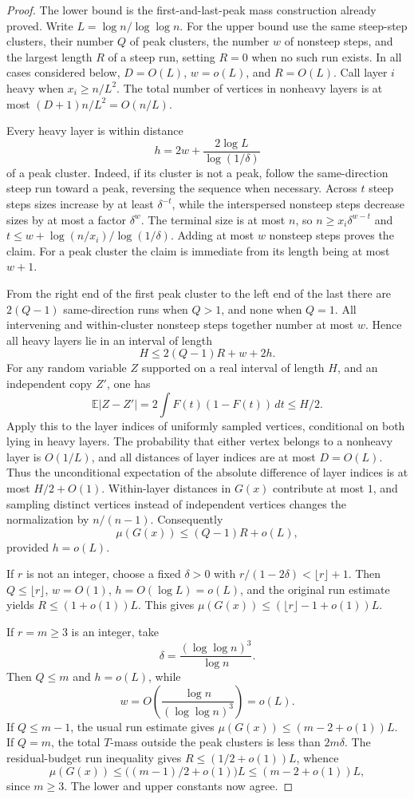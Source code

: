 \documentclass[11pt]{amsart}
\theoremstyle{definition}
\theoremstyle{remark}
\begin{document}
\begin{proof}
The lower bound is the first-and-last-peak mass construction already proved.
Write $L=\log n/\log\log n$. For the upper bound use the same steep-step
clusters, their number $Q$ of peak clusters, the number $w$ of nonsteep steps,
and the largest length $R$ of a steep run, setting $R=0$ when no such run
exists. In all cases considered below,
$D=O(L)$, $w=o(L)$, and $R=O(L)$.
Call layer $i$ heavy when $x_i\ge n/L^2$. The total number of vertices in
nonheavy layers is at most $(D+1)n/L^2=O(n/L)$.

Every heavy layer is within distance
\[
 h=2w+\frac{2\log L}{\log(1/\delta)}
\]
of a peak cluster. Indeed, if its cluster is not a peak, follow the
same-direction steep run toward a peak, reversing the sequence when necessary.
Across $t$ steep steps sizes increase by at least $\delta^{-t}$, while the
interspersed nonsteep steps decrease sizes by at most a factor $\delta^w$.
The terminal size is at most $n$, so
$n\ge x_i\delta^{w-t}$ and
$t\le w+\log(n/x_i)/\log(1/\delta)$. Adding at most $w$ nonsteep steps
proves the claim. For a peak cluster the claim is immediate from its
length being at most $w+1$.

From the right end of the first peak cluster to the left end of the last
there are $2(Q-1)$ same-direction runs when $Q>1$, and none when $Q=1$.
All intervening and within-cluster nonsteep steps together number at most
$w$. Hence all heavy layers lie in an interval of length
\[
 H\le 2(Q-1)R+w+2h.
\]
For any random variable $Z$ supported on a real interval of length $H$,
and an independent copy $Z'$, one has
\[
 \mathbb E|Z-Z'|=2\int F(t)(1-F(t))\,dt\le H/2.
\]
Apply this to the layer indices of uniformly sampled vertices, conditional
on both lying in heavy layers. The probability that either vertex belongs
to a nonheavy layer is $O(1/L)$, and all distances of layer indices are at
most $D=O(L)$. Thus the unconditional expectation of the absolute difference
of layer indices is at most $H/2+O(1)$. Within-layer distances in $G(x)$
contribute at most $1$, and sampling distinct vertices instead of independent
vertices changes the normalization by $n/(n-1)$. Consequently
\[
 \mu(G(x))\le (Q-1)R+o(L),
\]
provided $h=o(L)$.

If $r$ is not an integer, choose a fixed $\delta>0$ with
$r/(1-2\delta)<\lfloor r\rfloor+1$. Then $Q\le\lfloor r\rfloor$,
$w=O(1)$, $h=O(\log L)=o(L)$, and the original run estimate yields
$R\le(1+o(1))L$. This gives
$\mu(G(x))\le(\lfloor r\rfloor-1+o(1))L$.

If $r=m\ge3$ is an integer, take
\[
 \delta=\frac{(\log\log n)^3}{\log n}.
\]
Then $Q\le m$ and $h=o(L)$, while
\[
 w=O\!\left(\frac{\log n}{(\log\log n)^3}\right)=o(L).
\]
If $Q\le m-1$, the usual run estimate gives
$\mu(G(x))\le(m-2+o(1))L$.
If $Q=m$, the total $T$-mass outside the peak clusters is less than
$2m\delta$. The residual-budget run inequality gives
$R\le(1/2+o(1))L$, whence
\[
 \mu(G(x))\le\bigl((m-1)/2+o(1)\bigr)L
 \le(m-2+o(1))L,
\]
since $m\ge3$. The lower and upper constants now agree.
\end{proof}
\end{document}
